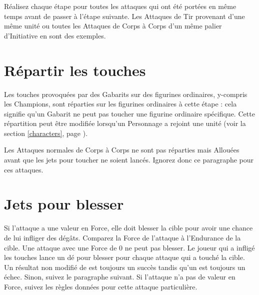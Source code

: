 Réalisez chaque étape pour toutes les attaques qui ont été portées en même temps avant de passer à l'étape suivante. Les Attaques de Tir provenant d'une même unité ou toutes les Attaques de Corps à Corps d'un même palier d'Initiative en sont des exemples.

\newpage
\section{Répartir les touches}

 Les touches provoquées par des Gabarits sur des figurines ordinaires, y-compris les Champions, sont réparties sur les figurines ordinaires à cette étape : cela signifie qu'un Gabarit ne peut pas toucher une figurine ordinaire spécifique. Cette répartition peut être modifiée lorsqu'un Personnage a rejoint une unité (voir la section \ref{characters}, page \pageref{characters}).

Les Attaques normales de Corps à Corps ne sont pas réparties mais Allouées avant que les jets pour toucher ne soient lancés. Ignorez donc ce paragraphe pour ces attaques. 


\section{Jets pour blesser}

Si l'attaque a une valeur en Force, elle doit blesser la cible pour avoir une chance de lui infliger des dégâts. Comparez la Force de l'attaque à l'Endurance de la cible. Une attaque avec une Force de 0 ne peut pas blesser. Le joueur qui a infligé les touches lance un dé pour blesser pour chaque attaque qui a touché la cible. Un résultat non modifié de  est toujours un succès tandis qu'un  est toujours un échec. Sinon, suivez le paragraphe suivant. Si l'attaque n'a pas de valeur en Force, suivez les règles données pour cette attaque particulière. 

